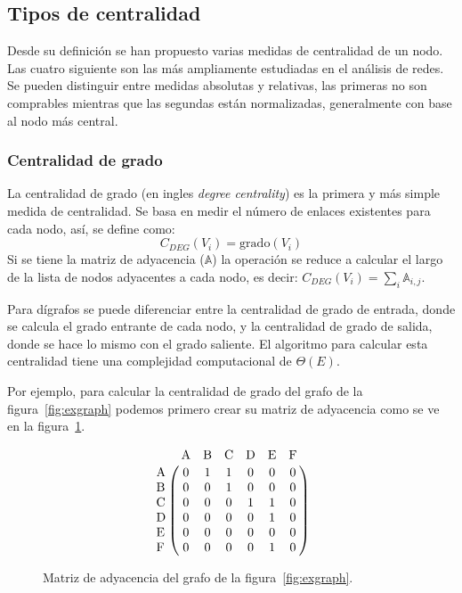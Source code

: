 \subsection{Tipos de centralidad}
Desde su definición se han propuesto varias medidas de centralidad de un nodo.
Las cuatro siguiente son las más ampliamente estudiadas en el análisis de redes.
Se pueden distinguir entre medidas absolutas y relativas, las primeras no son
comprables mientras que las segundas están normalizadas, generalmente con base
al nodo más central.

\subsubsection{Centralidad de grado}
La centralidad de grado (en ingles \emph{degree centrality}) es la primera y más
simple medida de centralidad\cite{sun2011survey}.
Se basa en medir el número de enlaces existentes para cada nodo, así, se define
como: 
\begin{equation}
  \label{eq:deg}
  C_{DEG}(V_i) = \text{grado}(V_i)
\end{equation}
Si se tiene la matriz de adyacencia ($\mathbb{A}$) la operación se reduce a
calcular el largo de la lista de nodos adyacentes a cada nodo, es decir:
$ C_{DEG}(V_i) = \sum_{i} \mathbb{A}_{i,j}$.

Para dígrafos se puede diferenciar entre la centralidad de grado de entrada,
donde se calcula el grado entrante de cada nodo, y la centralidad de grado de
salida, donde se hace lo mismo con el grado saliente. El algoritmo para calcular 
esta centralidad tiene una complejidad computacional de $\Theta (E)$.

Por ejemplo, para calcular la centralidad de grado del grafo de la
figura~\ref{fig:exgraph} podemos primero crear su matriz de adyacencia como se
ve en la figura~\ref{fig:adjmatrix}.

\begin{figure}[htpb]
  \begin{equation*}
    \bordermatrix{
       ~  & $A$ & $B$ & $C$ & $D$ & $E$ & $F$ \cr
      $A$ &  0  &  1  &  1  &  0  &  0  &  0  \cr
      $B$ &  0  &  0  &  1  &  0  &  0  &  0  \cr
      $C$ &  0  &  0  &  0  &  1  &  1  &  0  \cr
      $D$ &  0  &  0  &  0  &  0  &  1  &  0  \cr
      $E$ &  0  &  0  &  0  &  0  &  0  &  0  \cr
      $F$ &  0  &  0  &  0  &  0  &  1  &  0  \cr
    }
  \end{equation*}
  \caption{Matriz de adyacencia del grafo de la figura~\ref{fig:exgraph}.}
  \label{fig:adjmatrix}
\end{figure}

